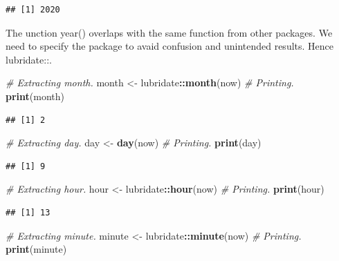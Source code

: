 \documentclass[]{book}
\newenvironment{Shaded}{\begin{snugshade}}{\end{snugshade}}
\newcommand{\CommentTok}[1]{\textcolor[rgb]{0.56,0.35,0.01}{\textit{#1}}}
\newcommand{\KeywordTok}[1]{\textcolor[rgb]{0.13,0.29,0.53}{\textbf{#1}}}
\newcommand{\NormalTok}[1]{#1}
\newcommand{\OperatorTok}[1]{\textcolor[rgb]{0.81,0.36,0.00}{\textbf{#1}}}
\newcommand{\StringTok}[1]{\textcolor[rgb]{0.31,0.60,0.02}{#1}}
\begin{document}
\begin{verbatim}
## [1] 2020
\end{verbatim}

The unction year() overlaps with the same function from other packages. We need to specify the package to avaid confusion and unintended results. Hence lubridate::.

\begin{Shaded}
\begin{Highlighting}[]
\CommentTok{# Extracting month.}
\NormalTok{month <-}\StringTok{ }\NormalTok{lubridate}\OperatorTok{::}\KeywordTok{month}\NormalTok{(now)}
\CommentTok{# Printing.}
\KeywordTok{print}\NormalTok{(month)}
\end{Highlighting}
\end{Shaded}

\begin{verbatim}
## [1] 2
\end{verbatim}

\begin{Shaded}
\begin{Highlighting}[]
\CommentTok{# Extracting day.}
\NormalTok{day <-}\StringTok{ }\KeywordTok{day}\NormalTok{(now)}
\CommentTok{# Printing.}
\KeywordTok{print}\NormalTok{(day)}
\end{Highlighting}
\end{Shaded}

\begin{verbatim}
## [1] 9
\end{verbatim}

\begin{Shaded}
\begin{Highlighting}[]
\CommentTok{# Extracting hour.}
\NormalTok{hour <-}\StringTok{ }\NormalTok{lubridate}\OperatorTok{::}\KeywordTok{hour}\NormalTok{(now)}
\CommentTok{# Printing.}
\KeywordTok{print}\NormalTok{(hour)}
\end{Highlighting}
\end{Shaded}

\begin{verbatim}
## [1] 13
\end{verbatim}

\begin{Shaded}
\begin{Highlighting}[]
\CommentTok{# Extracting minute.}
\NormalTok{minute <-}\StringTok{ }\NormalTok{lubridate}\OperatorTok{::}\KeywordTok{minute}\NormalTok{(now)}
\CommentTok{# Printing.}
\KeywordTok{print}\NormalTok{(minute)}
\end{Highlighting}
\end{Shaded}
\end{document}

